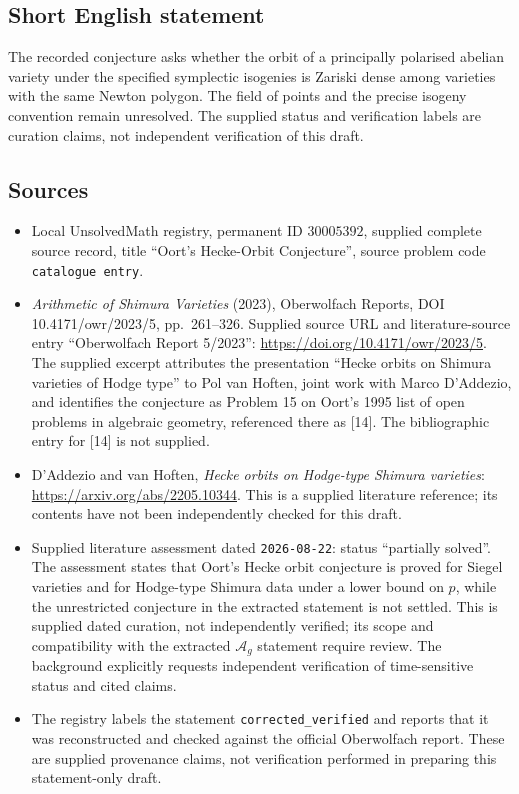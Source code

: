 \documentclass[11pt]{article}
\begin{document}
\subsection{Short English statement}
The recorded conjecture asks whether the orbit of a principally polarised abelian variety under the specified symplectic isogenies is Zariski dense among varieties with the same Newton polygon. The field of points and the precise isogeny convention remain unresolved. The supplied status and verification labels are curation claims, not independent verification of this draft.
\subsection{Sources}
\begin{itemize}
\item Local UnsolvedMath registry, permanent ID \(30005392\), supplied complete source record, title ``Oort's Hecke-Orbit Conjecture'', source problem code \texttt{catalogue entry}.
\item \emph{Arithmetic of Shimura Varieties} (2023), Oberwolfach Reports, DOI 10.4171/owr/2023/5, pp.\ 261--326. Supplied source URL and literature-source entry ``Oberwolfach Report 5/2023'': \url{https://doi.org/10.4171/owr/2023/5}. The supplied excerpt attributes the presentation ``Hecke orbits on Shimura varieties of Hodge type'' to Pol van Hoften, joint work with Marco D'Addezio, and identifies the conjecture as Problem 15 on Oort's 1995 list of open problems in algebraic geometry, referenced there as [14]. The bibliographic entry for [14] is not supplied.
\item D'Addezio and van Hoften, \emph{Hecke orbits on Hodge-type Shimura varieties}: \url{https://arxiv.org/abs/2205.10344}. This is a supplied literature reference; its contents have not been independently checked for this draft.
\item Supplied literature assessment dated \texttt{2026-08-22}: status ``partially solved''. The assessment states that Oort's Hecke orbit conjecture is proved for Siegel varieties and for Hodge-type Shimura data under a lower bound on \(p\), while the unrestricted conjecture in the extracted statement is not settled. This is supplied dated curation, not independently verified; its scope and compatibility with the extracted \(\mathcal A_g\) statement require review. The background explicitly requests independent verification of time-sensitive status and cited claims.
\item The registry labels the statement \texttt{corrected\_verified} and reports that it was reconstructed and checked against the official Oberwolfach report. These are supplied provenance claims, not verification performed in preparing this statement-only draft.
\end{itemize}
\end{document}
